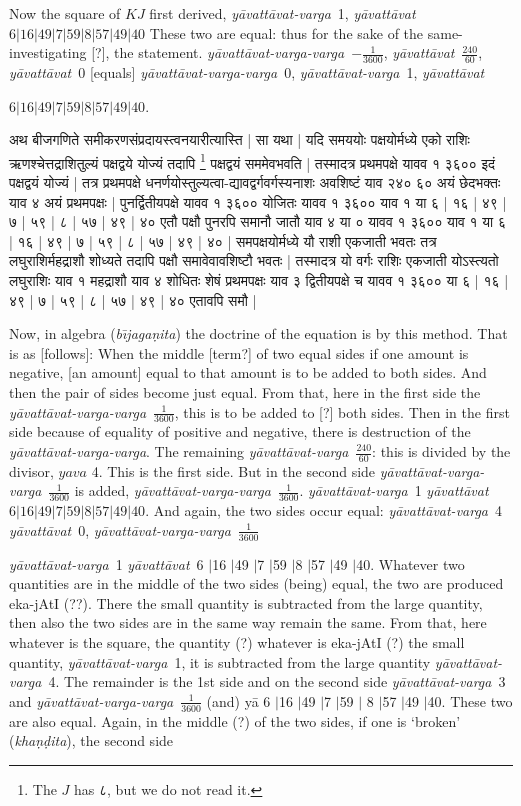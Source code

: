 \documentclass[12pt]{book}
\let\*=\d
\def\bijaganita{\textit{b\={\i}ja\-ga\*ni\-ta}}
\def\ya{\textit{y\=avat\-t\=avat}}
\def\yava{\textit{y\=avat\-t\=avat-varga}}
\def\yavava{\textit{y\=avat\-t\=avat-varga-varga}}
\def\danda{$|$}
\begin{document}
Now the square of $KJ$ first derived, \yava\ 1, \ya\ $6|16|49|7|59|8|57|49|40$
These two are equal: thus for the sake of the same-investigating [?], the statement.
\yavava\ $-\frac{1}{3600}$, \ya\ $\frac{240}{60}$, \ya\ 0 [equals] 
\yavava\ 0, \yava\ 1,
\ya\ 

$6|16|49|7|59|8|57|49|40$. 

\newpage

{\s अथ बीजगणिते समीकरणसंप्रदायस्त्वनयारीत्यास्ति |
सा यथा |
यदि समययोः पक्षयोर्मध्ये एको
राशिः ऋणश्चेत्तद्राशितुल्यं पक्षद्वये योज्यं तदापि \footnote{The $J$ has {\s ८}, but we do not read it.} पक्षद्वयं सममेवभवति |
तस्मादत्र प्रथमपक्षे यावव १ ३६०० इदं पक्षद्वयं योज्यं |
तत्र प्रथमपक्षे
धनर्णयोस्तुल्यत्वा-द्यावद्वर्गवर्गस्यनाशः अवशिष्टं याव २४० ६० अयं छेदभक्तः याव ४ अयं
प्रथमपक्षः |
पुनर्द्वितीयपक्षे यावव १ ३६०० योजितः यावव १ ३६०० याव १ या ६ | १६ | ४९ | ७ | ५९ | ८ | ५७ | ४९ |
४०
एतौ पक्षौ पुनरपि समानौ जातौ याव ४ या ० यावव १ ३६०० याव १ या ६ | १६ | ४९ | ७ | ५९ | ८ | ५७ | ४९ | ४० |
समपक्षयोर्मध्ये यौ राशी एकजाती भवतः तत्र लघुराशिर्महद्राशौ शोध्यते तदापि पक्षौ
समावेवावशिष्टौ भवतः | तस्मादत्र यो वर्गः राशिः एकजाती योऽस्त्यतो लघुराशिः याव १ महद्राशौ
याव ४ शोधितः शेषं प्रथमपक्षः याव ३ द्वितीयपक्षे च यावव १ ३६०० या ६ | १६ | ४९ | ७ | ५९ | ८ | ५७ | ४९ | ४०
एतावपि समौ |} 

\newpage

Now, in algebra (\bijaganita) the doctrine of the equation is by this method.
That is as [follows]:  When the middle [term?] of two equal sides 
if one amount is negative, [an amount] equal to that amount is to be added to
both sides.  And then the pair of sides become just equal. From that, here in 
the first side the \yavava\ $\frac{1}{3600}$, this is to be added to [?] both sides.
Then in the first side because of equality of positive and negative, there is
destruction of the \yavava. The remaining \yava\ $\frac{240}{60}$: this is 
divided by the divisor, $yava$ 4. This is the first side. But in the second side
\yavava\ $\frac{1}{3600}$ is added, \yavava\ $\frac{1}{3600}$. 
\yava\ 1 \ya\ $6|16|49|7|59|8|57|49|40$.  And again, the two sides occur
equal: \yava\ 4 \ya\ 0, \yavava\ $\frac{1}{3600}$ 

\yava\ 1 \ya\ 6 \danda 16 \danda 49 \danda 7 \danda 59 
\danda 8 \danda 57 \danda 49 \danda 40.   Whatever two quantities are in the middle 
of the two sides (being) equal, the two are produced eka-jAtI (??).  There the small 
quantity is subtracted from the large quantity, then also the  two sides are in the same 
way remain the same.  From that, here whatever is the square, the quantity (?) whatever 
is eka-jAtI (?) the small quantity, \yava\ 1, it is subtracted from the large quantity 
\yava\ 4.  The remainder is the 1st side and on the second side \yava\ 3 
and \yavava\ $\frac{1}{3600}$ (and) y\=a 6 \danda 16 \danda 49 \danda 7 \danda 59 \danda 
8 \danda 57 \danda 49 \danda 40.  These two are also equal.  Again, in the middle (?) 
of the two sides, if one is `broken' (\textit{kha\d n\d dita}), the second side 
\end{document}
